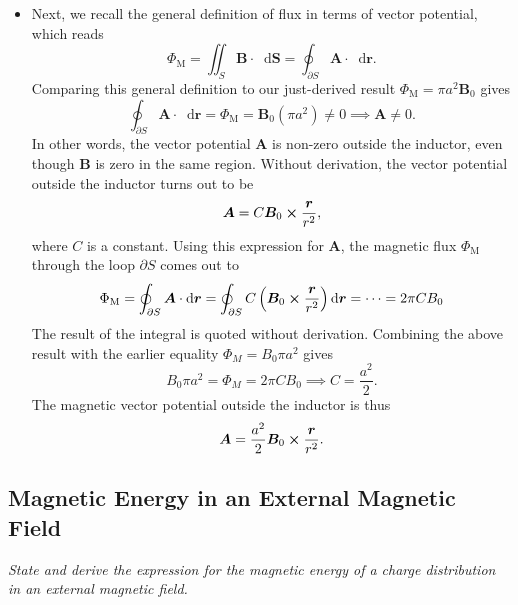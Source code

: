 \documentclass[11pt, a4paper]{article}
\newcommand{\diff}{\mathop{}\!\mathrm{d}} %
\renewcommand{\vec}[1]{\bm{#1}} %
\renewcommand{\r}{\vec{r}}
\newcommand{\B}{\vec{B}} %
\newcommand{\A}{\vec{A}} %
\begin{document}
\begin{itemize}
	\item Next, we recall the general definition of flux in terms of vector potential, which reads
	\begin{equation*}
		\Phi_{\text{M}} = \iint_{S} \B \cdot \diff \vec{S} = \oint_{\partial S} \A \cdot \diff \r.
	\end{equation*}
    Comparing this general definition to our just-derived result $ \Phi_{\text{M}} = \pi a^{2}\B_{0} $ gives
	\begin{equation*}
		\oint_{\partial S} \A \cdot \diff \r = \Phi_{\text{M}} = \B_{0} (\pi a^{2}) \neq 0  \implies \A \neq 0.
	\end{equation*}
    In other words, the vector potential $ \A $ is non-zero outside the inductor, even though $ \B $ is zero in the same region. Without derivation, the vector potential outside the inductor turns out to be
	\begin{equation*}
		\A = C \B_{0} \cross \frac{\r}{r^{2}},
	\end{equation*}
	where $ C $ is a constant. Using this expression for $ \A $, the magnetic flux $ \Phi_{\text{M}} $ through the loop $ \partial S $ comes out to
	\begin{equation*}
		\Phi_{\text{M}} = \oint_{\partial S} \A \cdot \diff \r  = \oint_{\partial S} C\left(\B_{0} \cross \frac{\r}{r^{2}}\right) \diff \r = \cdots = 2\pi C B_{0}
	\end{equation*}
	The result of the integral is quoted without derivation. Combining the above result with the earlier equality $ \Phi_{M} = B_{0}\pi a^{2} $ gives
	\begin{equation*}
		B_{0}\pi a^{2} = \Phi_{M} = 2\pi C B_{0} \implies C = \frac{a^{2}}{2}.
	\end{equation*}
	The magnetic vector potential outside the inductor is thus
	\begin{equation*}
		\A = \frac{a^{2}}{2} \B_{0} \cross \frac{\r}{r^{2}}.
	\end{equation*}

\end{itemize}



\subsection{Magnetic Energy in an External Magnetic Field}
\textit{State and derive the expression for the magnetic energy of a charge distribution in an external magnetic field.}
\end{document}
